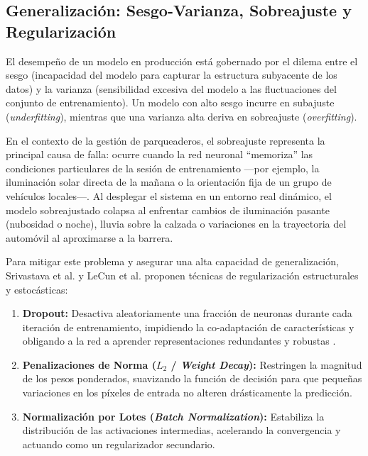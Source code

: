 \subsection{Generalización: Sesgo-Varianza, Sobreajuste y Regularización}

El desempeño de un modelo en producción está gobernado por el dilema entre el
sesgo (incapacidad del modelo para capturar la estructura subyacente de los
datos) y la varianza (sensibilidad excesiva del modelo a las fluctuaciones del
conjunto de entrenamiento). Un modelo con alto sesgo incurre en subajuste
(\textit{underfitting}), mientras que una varianza alta deriva en sobreajuste
(\textit{overfitting}).

En el contexto de la gestión de parqueaderos, el sobreajuste representa la
principal causa de falla: ocurre cuando la red neuronal ``memoriza'' las
condiciones particulares de la sesión de entrenamiento —por ejemplo, la
iluminación solar directa de la mañana o la orientación fija de un grupo de
vehículos locales—. Al desplegar el sistema en un entorno real dinámico, el
modelo sobreajustado colapsa al enfrentar cambios de iluminación pasante
(nubosidad o noche), lluvia sobre la calzada o variaciones en la trayectoria del
automóvil al aproximarse a la barrera.

Para mitigar este problema y asegurar una alta capacidad de generalización,
Srivastava et al. \cite{srivastava2014dropout} y LeCun et al. 
\cite{lecun2015deep} proponen técnicas de regularización estructurales y
estocásticas:

\begin{enumerate}
    \item \textbf{Dropout:} Desactiva aleatoriamente una fracción de neuronas
        durante cada iteración de entrenamiento, impidiendo la co-adaptación de
        características y obligando a la red a aprender representaciones
        redundantes y robustas \cite{srivastava2014dropout}.
        
    \item \textbf{Penalizaciones de Norma ($L_2$ / \textit{Weight Decay}):}
        Restringen la magnitud de los pesos ponderados, suavizando la función de
        decisión para que pequeñas variaciones en los píxeles de entrada no
        alteren drásticamente la predicción.

    \item \textbf{Normalización por Lotes (\textit{Batch Normalization}):}
        Estabiliza la distribución de las activaciones intermedias, acelerando la
        convergencia y actuando como un regularizador secundario.
\end{enumerate}


